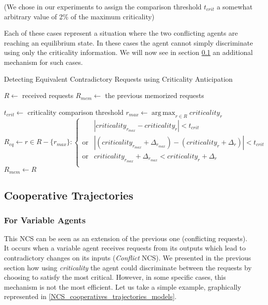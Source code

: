 (We chose in our experiments to assign the comparison threshold $t_{crit}$ a somewhat arbitrary value of 2\% of the maximum criticality)

Each of these cases represent a situation where the two conflicting agents are reaching an equilibrium state. In these cases the agent cannot simply discriminate using only the criticality information. We will now see in section \ref{coop_traj_descr} an additional mechanism for such cases.

\begin{algorithm}
\caption{Detecting Equivalent Contradictory Requests using Criticality Anticipation}
\label{algo_criticality_anticipation}
	$R \leftarrow $ received requests\;
	$R_{mem} \leftarrow $ the previous memorized requests\;
	
	$t_{crit} \leftarrow$ criticality comparison threshold\;
	\BlankLine
	$r_{max} \leftarrow \displaystyle\operatorname*{arg\,max}_{r \in R} criticality_r$\;
	$R_{eq} \leftarrow r \in R-\{r_{max}\}: \begin{cases}
															 			&| criticality_{r_{max}} - criticality_{r} | < t_{crit} \\
															 			\text{or} & | (criticality_{r_{max}} + \Delta_{r_{max}}) - (criticality_{r}+ \Delta_r ) | < t_{crit}\\ 
															 			\text{or} & criticality_{r_{max}} + \Delta_{r_{max}} < criticality_{r}+ \Delta_r \\
																\end{cases}$\;
	\BlankLine
	$R_{mem} \leftarrow R$\;
\end{algorithm}

\subsection{Cooperative Trajectories}\label{coop_traj_descr}

\subsubsection{For Variable Agents}

This NCS can be seen as an extension of the previous one (conflicting requests). It occurs when a variable agent receives requests from its outputs which lead to contradictory changes on its inputs (\emph{Conflict} NCS). We presented in the previous section how using \emph{criticality} the agent could discriminate between the requests by choosing to satisfy the most critical. However, in some specific cases, this mechanism is not the most efficient. Let us take a simple example, graphically represented in \figurename{} \ref{NCS_cooperatives_trajectories_models}.

